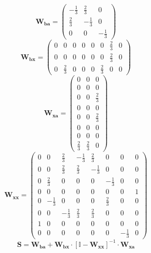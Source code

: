 \[ \mathbf{W_{ba}} = \left(\begin{array}{ccc} -\frac{1}{3} &
\frac{2}{3} & 0 \\ \frac{2}{3} & -\frac{1}{3} & 0 \\ 0 & 0 &
-\frac{1}{3} \end{array}\right) \]
\[ \mathbf{W_{bx}} = \left(\begin{array}{cccccccc} 0 & 0 & 0 & 0 & 0 &
0 & \frac{2}{3} & 0 \\ 0 & 0 & 0 & 0 & 0 & 0 & \frac{2}{3} & 0 \\ 0 &
\frac{2}{3} & 0 & 0 & 0 & \frac{2}{3} & 0 & 0 \end{array}\right) \]
\[ \mathbf{W_{xa}} = \left(\begin{array}{ccc} 0 & 0 & 0 \\ 0 & 0 & 0
\\ 0 & 0 & \frac{2}{3} \\ 0 & 0 & 0 \\ 0 & 0 & \frac{2}{3} \\ 0 & 0 &
0 \\ 0 & 0 & 0 \\ \frac{2}{3} & \frac{2}{3} & 0 \end{array}\right) \]
\[ \mathbf{W_{xx}} = \left(\begin{array}{cccccccc} 0 & 0 & \frac{2}{3}
& -\frac{1}{3} & \frac{2}{3} & 0 & 0 & 0 \\ 0 & 0 & \frac{2}{3} &
\frac{2}{3} & -\frac{1}{3} & 0 & 0 & 0 \\ 0 & \frac{2}{3} & 0 & 0 & 0
& -\frac{1}{3} & 0 & 0 \\ 0 & 0 & 0 & 0 & 0 & 0 & 0 & 1 \\ 0 &
-\frac{1}{3} & 0 & 0 & 0 & \frac{2}{3} & 0 & 0 \\ 0 & 0 & -\frac{1}{3}
& \frac{2}{3} & \frac{2}{3} & 0 & 0 & 0 \\ 1 & 0 & 0 & 0 & 0 & 0 & 0 &
0 \\ 0 & 0 & 0 & 0 & 0 & 0 & -\frac{1}{3} & 0 \end{array}\right) \]
\[ \mathbf{S}=\mathbf{W_{ba}}+\mathbf{W_{bx}}\cdot\left[ \mathbb{I}
-\mathbf{W_{xx}}\right]^{-1}\cdot\mathbf{W_{xa}} \]

